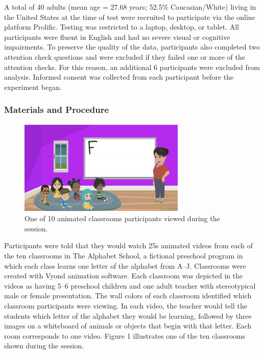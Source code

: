 \documentclass[10pt, letterpaper]{article}
\newenvironment{CodeChunk}{}{}
\begin{document}
A total of 40 adults (mean age = 27.68 years; 52.5\% Caucasian/White)
living in the United States at the time of test were recruited to
participate via the online platform Prolific. Testing was restricted to
a laptop, desktop, or tablet. All participants were fluent in English
and had no severe visual or cognitive impairments. To preserve the
quality of the data, participants also completed two attention check
questions and were excluded if they failed one or more of the attention
checks. For this reason, an additional 6 participants were excluded from
analysis. Informed consent was collected from each participant before
the experiment began.

\hypertarget{materials-and-procedure}{%
\subsubsection{Materials and Procedure}\label{materials-and-procedure}}

\begin{CodeChunk}
\begin{figure}[t]

{\centering \includegraphics{figs/e1-stimuli-1} 

}

\caption[One of 10 animated classrooms participants viewed during the session]{One of 10 animated classrooms participants viewed during the session.}\label{fig:e1-stimuli}
\end{figure}
\end{CodeChunk}

Participants were told that they would watch 25s animated videos from
each of the ten classrooms in The Alphabet School, a fictional preschool
program in which each class learns one letter of the alphabet from A--J.
Classrooms were created with Vyond animation software. Each classroom
was depicted in the videos as having 5--6 preschool children and one
adult teacher with stereotypical male or female presentation. The wall
colors of each classroom identified which classroom participants were
viewing. In each video, the teacher would tell the students which letter
of the alphabet they would be learning, followed by three images on a
whiteboard of animals or objects that begin with that letter. Each room
corresponds to one video. Figure 1 illustrates one of the ten classrooms
shown during the session.
\end{document}
